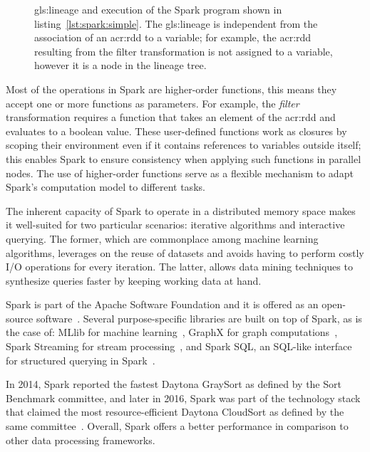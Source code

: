 \begin{figure}[t]
\caption[\Gls{gls:lineage} tree and execution of a Spark program]{\Gls{gls:lineage} and execution of the Spark program shown in listing~\ref{lst:spark:simple}. The \gls{gls:lineage} is independent from the association of an \acrshort{acr:rdd} to a variable; for example, the \acrshort{acr:rdd} resulting from the filter transformation is not assigned to a variable, however it is a node in the lineage tree.}
\end{figure}

Most of the operations in Spark are higher-order functions, this means they accept one or more functions as parameters. For example, the \textit{filter} transformation requires a function that takes an element of the \acrshort{acr:rdd} and evaluates to a boolean value. These user-defined functions work as closures by scoping their environment even if it contains references to variables outside itself; this enables Spark to ensure consistency when applying such functions in parallel nodes. The use of higher-order functions serve as a flexible mechanism to adapt Spark's computation model to different tasks.

The inherent capacity of Spark to operate in a distributed memory space makes it well-suited for two particular scenarios: iterative algorithms and interactive querying. The former, which are commonplace among machine learning algorithms, leverages on the reuse of datasets and avoids having to perform costly I/O operations for every iteration. The latter, allows data mining techniques to synthesize queries faster by keeping working data at hand.

Spark is part of the Apache Software Foundation and it is offered as an open-source software~\cite{WebApache2017,WebSpark2017}. Several purpose-specific libraries are built on top of Spark, as is the case of: MLlib for machine learning~\cite{Meng2016}, GraphX for graph computations~\cite{Xin2013}, Spark Streaming for stream processing~\cite{Zaharia2013}, and Spark SQL, an \mbox{SQL-like} interface for structured querying in Spark~\cite{Armbrust2015a}.

In 2014, Spark reported the fastest Daytona GraySort as defined by the Sort Benchmark committee, and later in 2016, Spark was part of the technology stack that claimed the most resource-efficient Daytona CloudSort as defined by the same committee~\cite{WebSortBenchmark2017,Xin2014,Wang}. Overall, Spark offers a better performance in comparison to other data processing frameworks.

